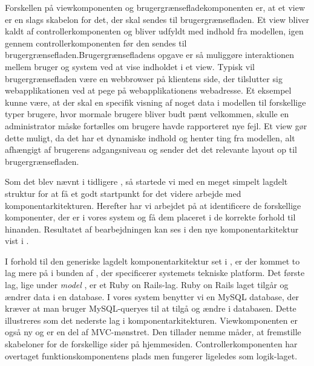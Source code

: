 
Forskellen på viewkomponenten og brugergrænsefladekomponenten er, at et view er en slags skabelon for det, der skal sendes til brugergrænsefladen. Et view bliver kaldt af controllerkomponenten og bliver udfyldt med indhold fra modellen, igen gennem controllerkomponenten før den sendes til brugergrænsefladen.Brugergrænsefladens opgave er så muliggøre interaktionen mellem bruger og system ved at vise indholdet i et view. Typisk vil brugergrænsefladen være en webbrowser på klientens side, der tilslutter sig webapplikationen ved at pege på webapplikationens webadresse. Et eksempel kunne være, at der skal en specifik visning af noget data i modellen til forskellige typer brugere, hvor mormale brugere bliver budt pænt velkommen, skulle en administrator måske fortælles om brugere havde rapporteret nye fejl. Et view gør dette muligt, da det har et dynamiske indhold og henter ting fra modellen, alt afhængigt af brugerens adgangsniveau og sender det det relevante layout op til brugergrænsefladen. 

Som det blev nævnt i tidligere , så startede vi med en meget simpelt lagdelt struktur for at få et godt startpunkt for det videre arbejde med komponentarkitekturen. Herefter har vi arbejdet på at identificere de forskellige komponenter, der er i vores system og få dem placeret i de korrekte forhold til hinanden. Resultatet af bearbejdningen kan ses i den nye komponentarkitektur vist i .

I forhold til den generiske lagdelt komponentarkitektur set i , er der kommet to lag mere på i bunden af , der specificerer systemets tekniske platform. Det første lag, lige under \textit{model} , er et Ruby on Rails-lag. Ruby on Rails laget tilgår og ændrer data i en database. I vores system benytter vi en MySQL database, der kræver at man bruger MySQL-queryes til at tilgå og ændre i databasen. Dette illustreres som det nederste lag i komponentarkitekturen. Viewkomponenten er også ny og er en del af MVC-mønstret. Den tillader nemme måder, at fremstille skabeloner for de forskellige sider på hjemmesiden. Controllerkomponenten har overtaget funktionskomponentens plads men fungerer ligeledes som logik-laget.

